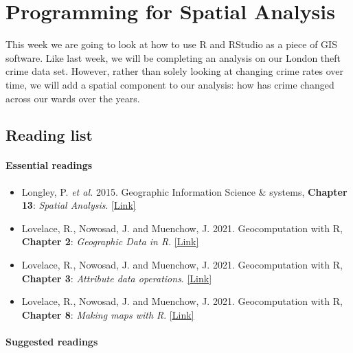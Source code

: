 \documentclass[
]{book}
\providecommand{\tightlist}{%
  \setlength{\itemsep}{0pt}\setlength{\parskip}{0pt}}
\begin{document}
\hypertarget{programming-for-spatial-analysis}{%
\chapter{Programming for Spatial Analysis}\label{programming-for-spatial-analysis}}

This week we are going to look at how to use R and RStudio as a piece of GIS software. Like last week, we will be completing an analysis on our London theft crime data set. However, rather than solely looking at changing crime rates over time, we will add a spatial component to our analysis: how has crime changed across our wards over the years.

\hypertarget{reading-w05}{%
\section{Reading list}\label{reading-w05}}

\hypertarget{essential-readings-4}{%
\subsubsection*{Essential readings}\label{essential-readings-4}}

\begin{itemize}
\tightlist
\item
  Longley, P. \emph{et al.} 2015. Geographic Information Science \& systems, \textbf{Chapter 13}: \emph{Spatial Analysis}. \href{https://rl.talis.com/3/ucl/items/fd38ec78-2bea-4165-aab3-0e9d9093db8e.html?lang=en-gb\&login=1}{{[}Link{]}}
\item
  Lovelace, R., Nowosad, J. and Muenchow, J. 2021. Geocomputation with R, \textbf{Chapter 2}: \emph{Geographic Data in R}. \href{https://geocompr.robinlovelace.net/spatial-class.html}{{[}Link{]}}
\item
  Lovelace, R., Nowosad, J. and Muenchow, J. 2021. Geocomputation with R, \textbf{Chapter 3}: \emph{Attribute data operations}. \href{https://geocompr.robinlovelace.net/geometric-operations.html}{{[}Link{]}}
\item
  Lovelace, R., Nowosad, J. and Muenchow, J. 2021. Geocomputation with R, \textbf{Chapter 8}: \emph{Making maps with R}. \href{https://geocompr.robinlovelace.net/adv-map.html}{{[}Link{]}}
\end{itemize}

\hypertarget{suggested-readings-4}{%
\subsubsection*{Suggested readings}\label{suggested-readings-4}}
\end{document}
